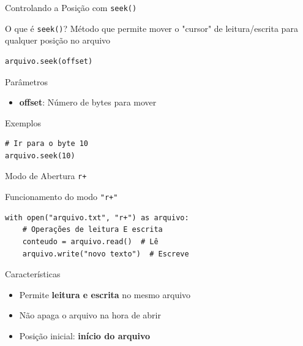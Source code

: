 \begin{frame}[fragile]{Controlando a Posição com \texttt{seek()}}

    \begin{block}{O que é \texttt{seek()}?}
        Método que permite mover o "cursor" de leitura/escrita para qualquer posição no arquivo
        \begin{verbatim}
arquivo.seek(offset)
        \end{verbatim}
    \end{block}

  
            \begin{alertblock}{Parâmetros}
                \begin{itemize}
                    \item \textbf{offset}: Número de bytes para mover
                    
                \end{itemize}
            \end{alertblock}
      
            \begin{exampleblock}{Exemplos}
                \begin{verbatim}
# Ir para o byte 10
arquivo.seek(10)
                \end{verbatim}
            \end{exampleblock}
 


    
   
\end{frame}

\begin{frame}[fragile]{Modo de Abertura \texttt{r+}}

\begin{block}{Funcionamento do modo \texttt{"r+"}}
\begin{verbatim}
with open("arquivo.txt", "r+") as arquivo:
    # Operações de leitura E escrita
    conteudo = arquivo.read()  # Lê
    arquivo.write("novo texto")  # Escreve
\end{verbatim}
\end{block}

        \begin{alertblock}{Características}
            \begin{itemize}
                \item Permite \textbf{leitura e escrita} no mesmo arquivo
               \item Não apaga o arquivo na hora de abrir
                \item Posição inicial: \textbf{início do arquivo}
            \end{itemize}
        \end{alertblock}

\end{frame}

